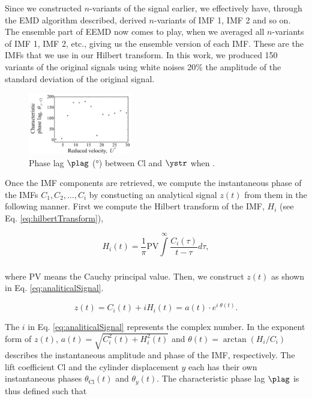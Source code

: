 \documentclass[a4paper,fleqn]{cas-sc}
\begin{document}
\noindent Since we constructed $n$-variants of the signal earlier, we effectively have, through the EMD algorithm described, derived $n$-variants of IMF 1, IMF 2 and so on. The ensemble part of EEMD now comes to play, when we averaged all $n$-variants of IMF 1, IMF 2, etc., giving us the ensemble version of each IMF. These are the IMFs that we use in our Hilbert transform. In this work, we produced 150 variants of the original signals using white noises 20\% the amplitude of the standard deviation of the original signal.

\begin{figure}
  \centering
  \includegraphics[width=0.4\textwidth]{figs/phaseLag5}
  \caption{Phase lag $\plag$ (\si{\degree}) between Cl and $\ystr$ when \angfi{}.}
  \label{fig:phaseLag90deg}
\end{figure}

Once the IMF components are retrieved, we compute the instantaneous phase of the IMFs $C_{1},C_{2},\dots,C_{i}$ by constucting an analytical signal $z \left( t \right)$ from them in the following manner. First we compute the Hilbert transform of the IMF, $H_{i}$ (see Eq. \ref{eq:hilbertTransform}),

\begin{equation}
  H_{i} \left( t \right) = \frac{1}{\pi} \text{PV} \int\limits_{}^{\infty} \frac{C_{i} \left( \tau \right)}{t - \tau} d\tau,
  \label{eq:hilbertTransform}
\end{equation}

\noindent where PV means the Cauchy principal value. Then, we construct $z \left( t \right)$ as shown in Eq. \ref{eq:analiticalSignal}.

\begin{equation}
  z \left( t \right) = C_{i} \left( t \right) + i H_{i} \left( t \right) = a(t) \cdot e^{i \; \theta(t)}.
  \label{eq:analiticalSignal}
\end{equation}

\noindent The $i$ in Eq. \ref{eq:analiticalSignal} represents the complex number. In the exponent form of $z \left( t \right)$, $a(t) = \sqrt{C^{2}_{i} \left( t \right) + H^{2}_{i} \left( t \right)}$ and $\theta (t) = \arctan \left( H_{i}/C_{i} \right)$ describes the instantaneous amplitude and phase of the IMF, respectively. The lift coefficient Cl and the cylinder displacement $y$ each has their own instantaneous phases $\theta_{\text{Cl}}(t)$ and $\theta_{y}(t)$. The characteristic phase lag $\plag$ is thus defined such that
\end{document}
